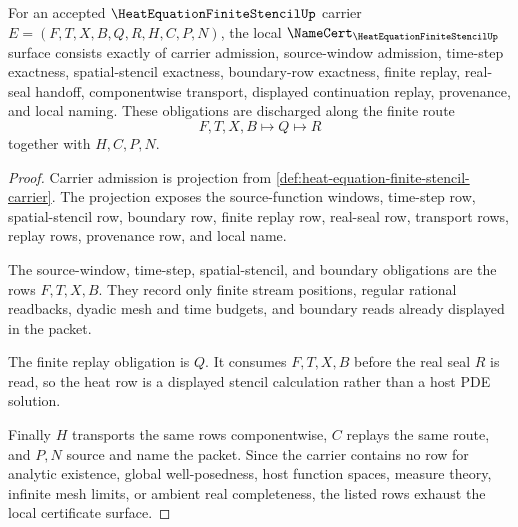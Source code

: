 \begin{theorem}
\label{thm:heat-equation-finite-stencil-namecert-obligations}
For an accepted $\HeatEquationFiniteStencilUp$ carrier
$E=(F,T,X,B,Q,R,H,C,P,N)$, the local
$\NameCert_{\HeatEquationFiniteStencilUp}$ surface consists exactly of carrier
admission, source-window admission, time-step exactness, spatial-stencil
exactness, boundary-row exactness, finite replay, real-seal handoff,
componentwise transport, displayed continuation replay, provenance, and local
naming. These obligations are discharged along the finite route
$$
F,T,X,B\longmapsto Q\longmapsto R
$$
together with $H,C,P,N$.
\end{theorem}
\begin{proof}
Carrier admission is projection from
\autoref{def:heat-equation-finite-stencil-carrier}. The projection exposes the
source-function windows, time-step row, spatial-stencil row, boundary row,
finite replay row, real-seal row, transport rows, replay rows, provenance row,
and local name.

The source-window, time-step, spatial-stencil, and boundary obligations are
the rows $F,T,X,B$. They record only finite stream positions, regular rational
readbacks, dyadic mesh and time budgets, and boundary reads already displayed
in the packet.

The finite replay obligation is $Q$. It consumes $F,T,X,B$ before the real
seal $R$ is read, so the heat row is a displayed stencil calculation rather
than a host PDE solution.

Finally $H$ transports the same rows componentwise, $C$ replays the same route,
and $P,N$ source and name the packet. Since the carrier contains no row for
analytic existence, global well-posedness, host function spaces, measure
theory, infinite mesh limits, or ambient real completeness, the listed rows
exhaust the local certificate surface.
\end{proof}

